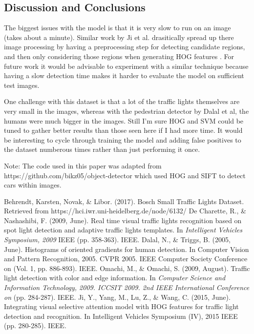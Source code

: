 \documentclass[a4paper]{article}
\begin{document}
\subsection{Discussion and Conclusions}
The biggest issues with the model is that it is very slow to run on an image (takes about a minute).  Similar work by Ji et al. drasitically spread up there image processing by having a preprocessing step for detecting candidate regions, and then only considering those regions when generating HOG features \cite{ji}.  For future work it would be advisable to experiment with a similar technique because having a slow detection time makes it harder to evaluate the model on sufficient test images.

One challenge with this dataset is that a lot of the traffic lights themselves are very small in the images, whereas with the pedestrian detector by Dalal et al, the humans were much bigger in the images.  Still I'm sure HOG and SVM could be tuned to gather better results than those seen here if I had more time. It would be interesting to cycle through training the model and adding false positives to the dataset numberous times rather than just performing it once.


Note: The code used in this paper was adapted from https://github.com/bikz05/object-detector which used HOG and SIFT to detect cars within images.


\begin{thebibliography}{9}
    Behrendt, Karsten, Novak, \& Libor. (2017). Bosch Small Traffic Lights Dataset. Retrieved from https://hci.iwr.uni-heidelberg.de/node/6132/
    De Charette, R., \& Nashashibi, F. (2009, June). Real time visual traffic lights recognition based on spot light detection and adaptive traffic lights templates. In \emph{Intelligent Vehicles Symposium, 2009} IEEE (pp. 358-363). IEEE.
    Dalal, N., \& Triggs, B. (2005, June). Histograms of oriented gradients for human detection. In Computer Vision and Pattern Recognition, 2005. CVPR 2005. IEEE Computer Society Conference on (Vol. 1, pp. 886-893). IEEE.
    Omachi, M., \& Omachi, S. (2009, August). Traffic light detection with color and edge information. In \emph{Computer Science and Information Technology, 2009. ICCSIT 2009. 2nd IEEE International Conference on} (pp. 284-287). IEEE.
    Ji, Y., Yang, M., Lu, Z., \& Wang, C. (2015, June). Integrating visual selective attention model with HOG features for traffic light detection and recognition. In Intelligent Vehicles Symposium (IV), 2015 IEEE (pp. 280-285). IEEE.


\end{thebibliography}
\end{document}
